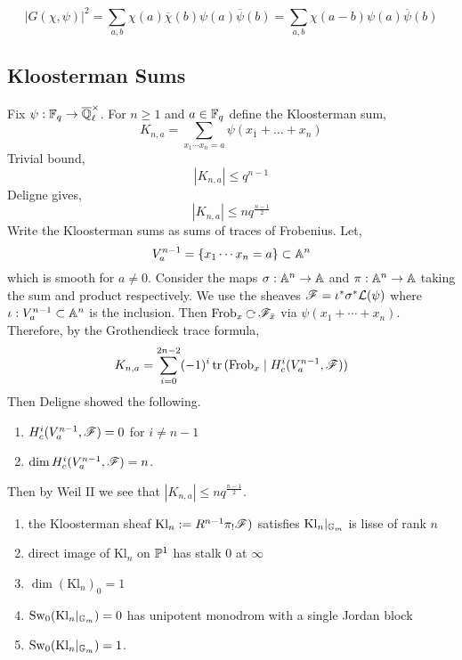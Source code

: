 \documentclass[12pt]{article}
\begin{document}
\begin{rmk}
\[ |G(\chi, \psi)|^2 = \sum_{a,b} \chi(a) \overline{\chi}(b) \psi(a) \overline{\psi}(b) = \sum_{a,b} \chi(a - b) \psi(a) \overline{\psi}(b) \]
\end{rmk}

\subsection{Kloosterman Sums}

Fix $\psi : \FF_q \to \Qbar_\ell^\times$. For $n \ge 1$ and $a \in \FF_q$ define the Kloosterman sum,
\[ K_{n,a} = \sum_{x_1 \cdots x_n = a} \psi(x_1 + \dots + x_n) \]
Trivial bound,
\[ |K_{n,a}| \le q^{n-1} \]
Deligne gives,
\[ |K_{n,a}| \le n q^{\frac{n-1}{2}} \]
Write the Kloosterman sums as sums of traces of Frobenius. Let,
\[ V_a^{n-1} = \{ x_1 \cdots x_n = a \} \subset \A^n \]
which is smooth for $a \neq 0$. Consider the maps $\sigma : \A^n \to \A$ and $\pi : \A^n \to \A$ taking the sum and product respectively. We use the sheaves $\F = \iota^* \sigma^* \L(\psi)$ where $\iota : V_a^{n-1} \subset \A^n$ is the inclusion. Then $\Frob_x \acts \F_{\bar{x}}$ via $\psi(x_1 + \cdots + x_n)$. Therefore, by the Grothendieck trace formula,
\[ K_{n,a} = \sum_{i = 0}^{2n-2} (-1)^i \tr{(\Frob_x \mid H^i_c(V_a^{n-1}, \F))} \]
Then Deligne showed the following.

\begin{theorem}[Deligne]
\begin{enumerate}
\item $H^i_c(V_a^{n-1}, \F) = 0$ for $i \neq n - 1$
\item $\dim H^i_c(V_a^{n-1}, \F) = n$.
\end{enumerate}
\end{theorem}

\begin{cor}
Then by Weil II we see that $|K_{n,a}| \le n q^{\frac{n-1}{2}}$. 
\end{cor}

\newcommand{\Kl}{\mathrm{Kl}}

\begin{thm}[Deligne]
\begin{enumerate}
\item the Kloosterman sheaf $\Kl_n := R^{n-1} \pi_{!} \F)$ satisfies $\Kl_n |_{\Gm}$ is lisse of rank $n$
\item direct image of $\Kl_n$ on $\P^1$ has stalk $0$ at $\infty$
\item $\dim{(\Kl_n)_0} = 1$
\item $\Sw_0(\Kl_n|_{\Gm}) = 0$ has unipotent monodrom with a single Jordan block
\item $\Sw_0(\Kl_n|_{\Gm}) = 1$.
\end{enumerate}
\end{thm}
\end{document}
